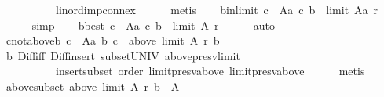 \begin{isabellebody}
\ \ \ \ \ \ \ \ \ \ lin{\isacharunderscore}{\kern0pt}ord{\isacharunderscore}{\kern0pt}imp{\isacharunderscore}{\kern0pt}connex\isanewline
\ \ \ \ \isamarkupfalse%
\ metis\isanewline
\ \ \isamarkupfalse%
\ b{\isacharunderscore}{\kern0pt}in{\isacharunderscore}{\kern0pt}limit{\isacharcolon}{\kern0pt}\ {\isachardoublequoteopen}{\isasymforall}c\ {\isasymin}\ A{\isacharminus}{\kern0pt}{\isacharbraceleft}{\kern0pt}a{\isacharbraceright}{\kern0pt}{\isachardot}{\kern0pt}\ {\isacharparenleft}{\kern0pt}c{\isacharcomma}{\kern0pt}\ b{\isacharparenright}{\kern0pt}\ {\isasymin}\ limit\ {\isacharparenleft}{\kern0pt}A{\isacharminus}{\kern0pt}{\isacharbraceleft}{\kern0pt}a{\isacharbraceright}{\kern0pt}{\isacharparenright}{\kern0pt}\ r{\isachardoublequoteclose}\isanewline
\ \ \ \ \isamarkupfalse%
\ simp\isanewline
\ \ \isamarkupfalse%
\ b{\isacharunderscore}{\kern0pt}best{\isacharcolon}{\kern0pt}\ {\isachardoublequoteopen}{\isasymforall}c\ {\isasymin}\ A{\isacharminus}{\kern0pt}{\isacharbraceleft}{\kern0pt}a{\isacharbraceright}{\kern0pt}{\isachardot}{\kern0pt}\ {\isacharparenleft}{\kern0pt}c{\isacharcomma}{\kern0pt}\ b{\isacharparenright}{\kern0pt}\ {\isasymin}\ limit\ A\ r{\isachardoublequoteclose}\isanewline
\ \ \ \ \isamarkupfalse%
\ auto\isanewline
\ \ \isamarkupfalse%
\ c{\isacharunderscore}{\kern0pt}not{\isacharunderscore}{\kern0pt}above{\isacharunderscore}{\kern0pt}b{\isacharcolon}{\kern0pt}\ {\isachardoublequoteopen}{\isasymforall}c\ {\isasymin}\ A{\isacharminus}{\kern0pt}{\isacharbraceleft}{\kern0pt}a{\isacharcomma}{\kern0pt}\ b{\isacharbraceright}{\kern0pt}{\isachardot}{\kern0pt}\ c\ {\isasymnotin}\ above\ {\isacharparenleft}{\kern0pt}limit\ A\ r{\isacharparenright}{\kern0pt}\ b{\isachardoublequoteclose}\isanewline
\ \ \ \ \isamarkupfalse%
\ b\ Diff{\isacharunderscore}{\kern0pt}iff\ Diff{\isacharunderscore}{\kern0pt}insert{}\ subset{\isacharunderscore}{\kern0pt}UNIV\ above{\isacharunderscore}{\kern0pt}presv{\isacharunderscore}{\kern0pt}limit\isanewline
\ \ \ \ \ \ \ \ \ \ insert{\isacharunderscore}{\kern0pt}subset\ order\ limit{\isacharunderscore}{\kern0pt}presv{\isacharunderscore}{\kern0pt}above\ limit{\isacharunderscore}{\kern0pt}presv{\isacharunderscore}{\kern0pt}above{}\isanewline
\ \ \ \ \isamarkupfalse%
\ metis\isanewline
\ \ \isamarkupfalse%
\ \isamarkupfalse%
\ above{\isacharunderscore}{\kern0pt}subset{\isacharcolon}{\kern0pt}\ {\isachardoublequoteopen}above\ {\isacharparenleft}{\kern0pt}limit\ A\ r{\isacharparenright}{\kern0pt}\ b\ {\isasymsubseteq}\ A{\isachardoublequoteclose}\isanewline

\end{isabellebody}
